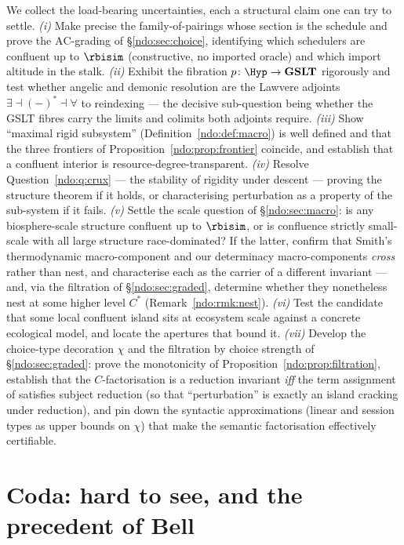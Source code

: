 We collect the load-bearing uncertainties, each a structural claim one can try to settle.
\emph{(i)} Make precise the family-of-pairings whose section is the schedule and prove the
$\mathrm{AC}$-grading of \S\ref{ndo:sec:choice}, identifying which schedulers are confluent up
to $\rbisim$ (constructive, no imported oracle) and which import altitude in the stalk.
\emph{(ii)} Exhibit the fibration $p\colon\Hyp\to\mathbf{GSLT}$ rigorously and test whether angelic
and demonic resolution are the Lawvere adjoints $\exists \dashv (-)^{*} \dashv \forall$ to
reindexing --- the decisive sub-question being whether the GSLT fibres carry the limits and
colimits both adjoints require. \emph{(iii)} Show ``maximal rigid subsystem''
(Definition~\ref{ndo:def:macro}) is well defined and that the three frontiers of
Proposition~\ref{ndo:prop:frontier} coincide, and establish that a confluent interior is
resource-degree-transparent. \emph{(iv)} Resolve Question~\ref{ndo:q:crux} --- the stability of
rigidity under descent --- proving the structure theorem if it holds, or characterising
perturbation as a property of the sub-system if it fails. \emph{(v)} Settle the scale
question of \S\ref{ndo:sec:macro}: is any biosphere-scale structure confluent up to $\rbisim$,
or is confluence strictly small-scale with all large structure race-dominated? If the
latter, confirm that Smith's thermodynamic macro-component and our determinacy
macro-components \emph{cross} rather than nest, and characterise each as the carrier of a
different invariant --- and, via the filtration of \S\ref{ndo:sec:graded}, determine whether they
nonetheless nest at some higher level $C^{*}$ (Remark~\ref{ndo:rmk:nest}). \emph{(vi)} Test the
candidate that some local confluent island sits at ecosystem scale against a concrete ecological
model, and locate the apertures that bound it. \emph{(vii)} Develop the choice-type decoration
$\chi$ and the filtration by choice strength of \S\ref{ndo:sec:graded}: prove the monotonicity of
Proposition~\ref{ndo:prop:filtration}, establish that the $C$-factorisation is a reduction invariant
\emph{iff} the term assignment of \cite{choicesched} satisfies subject reduction (so that
``perturbation'' is exactly an island cracking under reduction), and pin down the syntactic
approximations (linear and session types as upper bounds on $\chi$) that make the semantic
factorisation effectively certifiable.


\section{Coda: hard to see, and the precedent of Bell}\label{ndo:sec:coda}

